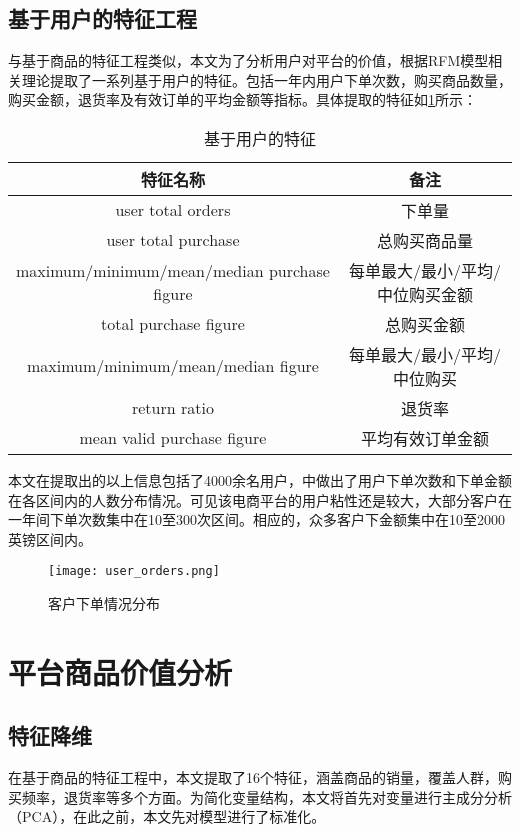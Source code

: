 \documentclass[lang=cn,11pt,a4paper,cite=authoryear]{elegantpaper}
\begin{document}
\subsection{基于用户的特征工程}
与基于商品的特征工程类似，本文为了分析用户对平台的价值，根据RFM模型相关理论提取了一系列基于用户的特征。包括一年内用户下单次数，购买商品数量，购买金额，退货率及有效订单的平均金额等指标。具体提取的特征如\ref{基于用户的特征}所示：
\begin{center}
\begin{longtable}{c|c}
    \caption{基于用户的特征}
    \label{基于用户的特征}\\
    \hline
      \textbf{特征名称} & \textbf{备注} \\
      \hline
      user total orders  & 下单量 \\
      user total purchase  & 总购买商品量 \\
      maximum/minimum/mean/median purchase figure & 每单最大/最小/平均/中位购买金额  \\
      total purchase figure   & 总购买金额 \\
      maximum/minimum/mean/median figure & 每单最大/最小/平均/中位购买 \\
      return ratio & 退货率 \\
      mean valid purchase figure & 平均有效订单金额 \\
      \hline
  \end{longtable}
\end{center}

本文在提取出的以上信息包括了4000余名用户，中做出了用户下单次数和下单金额在各区间内的人数分布情况。可见该电商平台的用户粘性还是较大，大部分客户在一年间下单次数集中在10至300次区间。相应的，众多客户下金额集中在10至2000英镑区间内。
\begin{figure}[H]
  \centering
  \texttt{[image: user\_orders.png]}
  \caption{客户下单情况分布}
  \label{客户下单情况分布}
\end{figure}

\section{平台商品价值分析}

\subsection{特征降维}

在基于商品的特征工程中，本文提取了16个特征，涵盖商品的销量，覆盖人群，购买频率，退货率等多个方面。为简化变量结构，本文将首先对变量进行主成分分析（PCA），在此之前，本文先对模型进行了标准化。
\end{document}
